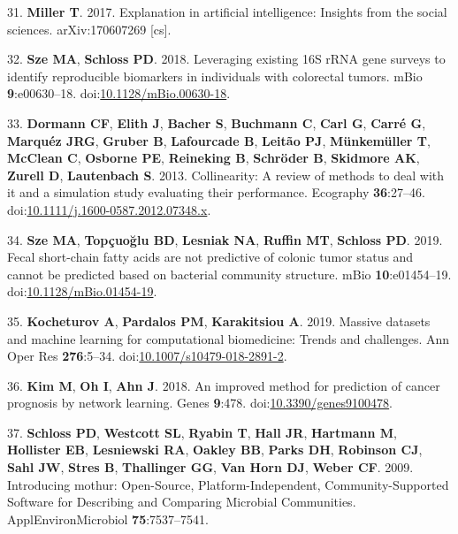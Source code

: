 \documentclass[11pt,]{article}
\begin{document}
\hypertarget{ref-miller_explanation_2017}{}
31. \textbf{Miller T}. 2017. Explanation in artificial intelligence:
Insights from the social sciences. arXiv:170607269 {[}cs{]}.

\hypertarget{ref-sze_leveraging_2018}{}
32. \textbf{Sze MA}, \textbf{Schloss PD}. 2018. Leveraging existing 16S
rRNA gene surveys to identify reproducible biomarkers in individuals
with colorectal tumors. mBio \textbf{9}:e00630--18.
doi:\href{https://doi.org/10.1128/mBio.00630-18}{10.1128/mBio.00630-18}.

\hypertarget{ref-dormann_collinearity:_2013}{}
33. \textbf{Dormann CF}, \textbf{Elith J}, \textbf{Bacher S},
\textbf{Buchmann C}, \textbf{Carl G}, \textbf{Carré G}, \textbf{Marquéz
JRG}, \textbf{Gruber B}, \textbf{Lafourcade B}, \textbf{Leitão PJ},
\textbf{Münkemüller T}, \textbf{McClean C}, \textbf{Osborne PE},
\textbf{Reineking B}, \textbf{Schröder B}, \textbf{Skidmore AK},
\textbf{Zurell D}, \textbf{Lautenbach S}. 2013. Collinearity: A review
of methods to deal with it and a simulation study evaluating their
performance. Ecography \textbf{36}:27--46.
doi:\href{https://doi.org/10.1111/j.1600-0587.2012.07348.x}{10.1111/j.1600-0587.2012.07348.x}.

\hypertarget{ref-sze_fecal_2019}{}
34. \textbf{Sze MA}, \textbf{Topçuoğlu BD}, \textbf{Lesniak NA},
\textbf{Ruffin MT}, \textbf{Schloss PD}. 2019. Fecal short-chain fatty
acids are not predictive of colonic tumor status and cannot be predicted
based on bacterial community structure. mBio \textbf{10}:e01454--19.
doi:\href{https://doi.org/10.1128/mBio.01454-19}{10.1128/mBio.01454-19}.

\hypertarget{ref-kocheturov_massive_2019}{}
35. \textbf{Kocheturov A}, \textbf{Pardalos PM}, \textbf{Karakitsiou A}.
2019. Massive datasets and machine learning for computational
biomedicine: Trends and challenges. Ann Oper Res \textbf{276}:5--34.
doi:\href{https://doi.org/10.1007/s10479-018-2891-2}{10.1007/s10479-018-2891-2}.

\hypertarget{ref-kim_improved_2018}{}
36. \textbf{Kim M}, \textbf{Oh I}, \textbf{Ahn J}. 2018. An improved
method for prediction of cancer prognosis by network learning. Genes
\textbf{9}:478.
doi:\href{https://doi.org/10.3390/genes9100478}{10.3390/genes9100478}.

\hypertarget{ref-schloss_introducing_2009}{}
37. \textbf{Schloss PD}, \textbf{Westcott SL}, \textbf{Ryabin T},
\textbf{Hall JR}, \textbf{Hartmann M}, \textbf{Hollister EB},
\textbf{Lesniewski RA}, \textbf{Oakley BB}, \textbf{Parks DH},
\textbf{Robinson CJ}, \textbf{Sahl JW}, \textbf{Stres B},
\textbf{Thallinger GG}, \textbf{Van Horn DJ}, \textbf{Weber CF}. 2009.
Introducing mothur: Open-Source, Platform-Independent,
Community-Supported Software for Describing and Comparing Microbial
Communities. ApplEnvironMicrobiol \textbf{75}:7537--7541.
\end{document}
